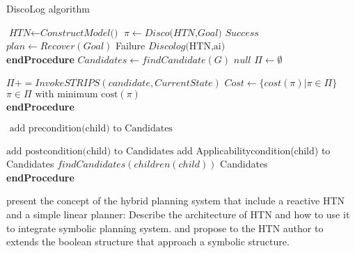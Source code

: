 \documentclass[conference]{IEEEtran}
\begin{document}
		\begin{algorithm}
			\caption{DiscoLog algorithm }\label{euclid}
			\begin{algorithmic}[]
				\State $\textit{HTN} \gets\textit{ConstructModel()} $
				\State $\pi \gets Disco \textit{(HTN,Goal)}$
				\State \Return $\textit{Success} $
				\Else 
				\State$ plan \gets Recover(Goal)$
				\State \Return Failure
				\Else 
				\State  $\textit{Discolog} \text{(HTN,ai)}$
				\EndFor
				\EndIf
				\EndIf
				\\
				\EndProcedure \textbf{endProcedure}
				\State 
				\State $\textit{Candidates}\gets\textit{findCandidate}{(G)} $
				\State \Return $\textit{null} $
				\Else 
				\State $\Pi \gets \emptyset$
				
				\State $\Pi += InvokeSTRIPS(candidate,CurrentState)$
				\State  $Cost \gets \{ cost(\pi) | \pi \in  \Pi \} $
				\EndFor
				\EndIf
				\State \Return $\pi \in \Pi \text{ with minimum cost}(\pi)$
				\\
				\EndProcedure \textbf{endProcedure}
				
				\State 
				
				\State $  \text{ add precondition(child) to Candidates}$
				
				\State $\text{add postcondition(child) to Candidates}$
				\EndIf
				\State add Applicabilitycondition(child) to Candidates
				\EndIf
				\State $\textit{findCandidates} (children(child))$
				\EndFor
				\State \Return Candidates
				\\
				\EndProcedure \textbf{endProcedure}
			
		\end{algorithmic}
	\end{algorithm}	present the concept of the hybrid planning system that include a reactive HTN and a simple linear planner:		
		Describe the architecture of HTN and how to use it to integrate symbolic planning system. and propose to the HTN author to extends the boolean structure that approach a symbolic structure. 
		
\end{document}
